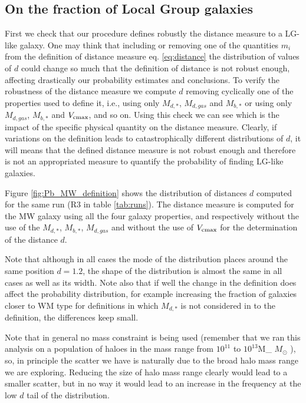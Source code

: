 \documentclass[useAMS,usenatbib]{mn2e}
\def \Msun {\ifmmode M_{\odot} \else $M_{\odot}$ \fi}
\begin{document}
\subsection{On the fraction of Local Group galaxies}
\label{sec:Probabilities}

First we check that our procedure defines robustly the distance
measure to a LG-like galaxy. One may think that including or removing
one of the quantities $m_i$ from the definition of distance measure
eq. \ref{eq:distance} the distribution of values of $d$ could change
so much that the definition of distance is not robust enough,
affecting drastically our probability estimates and conclusions. To
verify the robustness of the distance measure we compute $d$ removing
cyclically one of the properties used to define it, i.e., using only
$M_{d,*}$, $M_{d,gas}$ and $M_{b,*}$ or using only $M_{d,gas}$,
$M_{b,*}$ and $V_{\rm cmax}$, and so on. Using this check we can see
which is the impact of the specific physical quantity on the distance
measure. Clearly, if variations on the definition leads to
catastrophically different distributions of $d$, it will means that
the defined distance measure is not robust enough and therefore is not
an appropriated measure to quantify the probability of finding LG-like
galaxies.

Figure \ref{fig:Pb_MW_definition} shows the distribution of distances
$d$ computed for the same run (R3 in table \ref{tab:runs}). The
distance measure is computed for the MW galaxy using all the four
galaxy properties, and respectively without the use of the $M_{d,*}$,
$M_{b,*}$, $M_{d,gas}$ and without the use of $V_{\rm cmax}$ for the
determination of the distance $d$.

Note that although in all cases the mode of the distribution places
around the same position $d=1.2$, the shape of the distribution is
almost the same in all cases as well as its width. Note also that if
well the change in the definition does affect the probability
distribution, for example increasing the fraction of galaxies closer
to WM type for definitions in which $M_{d,*}$ is not considered in to
the definition, the differences keep small.


Note that in general no mass constraint is being used (remember that
we ran this analysis on a population of haloes in the mass range from
$10^{11}$ to $10^{13}$\Msun), so, in principle the scatter we have is
naturally due to the broad halo mass range we are exploring. Reducing
the size of halo mass range clearly would lead to a smaller scatter,
but in no way it would lead to an increase in the frequency at the low
$d$ tail of the distribution.
\end{document}
